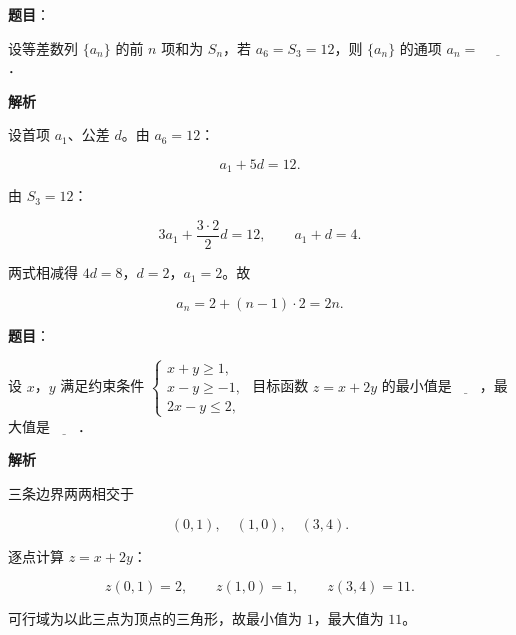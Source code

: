 \begin{answer}

\textbf{题目}：

设等差数列 $\{a_n\}$ 的前 $n$ 项和为 $S_n$，若 $a_6=S_3=12$，则 $\{a_n\}$ 的通项 $a_n=$ $\underline{\qquad}$．

\textbf{解析}

设首项 $a_1$、公差 $d$。由 $a_6=12$：

\nopagebreak[4]
\[a_1+5d=12.\]

由 $S_3=12$：

\nopagebreak[4]
\[3a_1+\frac{3\cdot2}2d=12,\qquad a_1+d=4.\]

两式相减得 $4d=8$，$d=2$，$a_1=2$。故

\nopagebreak[4]
\[a_n=2+(n-1)\cdot2=2n.\]


\end{answer}
\begin{answer}

\textbf{题目}：

设 $x$，$y$ 满足约束条件 $\begin{cases}x+y\geqslant1,\\ x-y\geqslant-1,\\ 2x-y\leqslant2,\end{cases}$ 目标函数 $z=x+2y$ 的最小值是$\underline{\qquad}$，最大值是$\underline{\qquad}$．

\textbf{解析}

三条边界两两相交于

\nopagebreak[4]
\[(0,1),\quad (1,0),\quad (3,4).\]

逐点计算 $z=x+2y$：

\nopagebreak[4]
\[z(0,1)=2,\qquad z(1,0)=1,\qquad z(3,4)=11.\]

可行域为以此三点为顶点的三角形，故最小值为 $1$，最大值为 $11$。


\end{answer}
